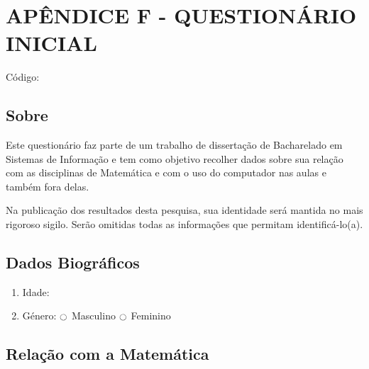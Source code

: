 \chapter*{APÊNDICE F - QUESTIONÁRIO INICIAL}\label{apendice_questionario_inicial}



\noindent
Código: 

\section{Sobre}

Este questionário faz parte de um trabalho de dissertação de Bacharelado em Sistemas de Informação e tem como objetivo recolher dados sobre sua relação com as disciplinas de Matemática e com o uso do computador nas aulas e também fora delas.

Na publicação dos resultados desta pesquisa, sua identidade será mantida no mais rigoroso sigilo. Serão omitidas todas as informações que permitam identificá-lo(a). 

\section{Dados Biográficos}

\begin{enumerate}
	\item Idade: 
    \item Género: $\ocircle$ Masculino $\ocircle$ Feminino
\end{enumerate}

\section{Relação com a Matemática}

